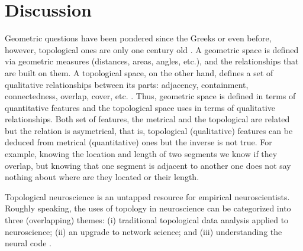 \documentclass[onecollarge,runningheads]{svjour2}
\begin{document}

\section{Discussion}
\label{se:discuss}
Geometric questions have been pondered since the Greeks or even before, however, topological ones are only one century old  \cite{edelsbrunner2010computational}.  A geometric space is defined via geometric measures (distances, areas, angles, etc.), and the relationships that are built on them. A topological space, on the other hand, defines a set of qualitative relationships between its parts: adjacency, containment, connectedness, overlap, cover, etc. \cite{aleksandrov1999mathematics}. Thus, geometric space is defined in terms of quantitative features and the topological space uses  
in terms of qualitative relationships.  Both set of features, the metrical and the topological are related but the relation is asymetrical, that is, topological (qualitative) features can be deduced from metrical (quantitative) ones but the inverse is not true. For example, knowing the location and length of two segments we know if they overlap, but knowing that one segment is adjacent to another one does not say nothing about where are they located or their length. 

Topological neuroscience is an untapped resource for empirical neuroscientists.
Roughly speaking, the uses of topology in neuroscience can be categorized into three (overlapping) themes: (i) traditional topological data analysis applied to neuroscience; (ii) an upgrade to network science; and (iii) understanding the neural code \cite{curto2016can}.
\end{document}
